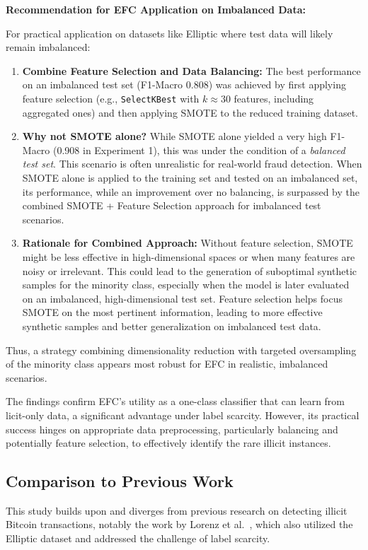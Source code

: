 \documentclass[12pt]{article}
\begin{document}
\begin{mdframed}[backgroundcolor=gray!10, roundcorner=5pt, linecolor=black, linewidth=1pt]
\textbf{Recommendation for EFC Application on Imbalanced Data:}

For practical application on datasets like Elliptic where test data will likely remain imbalanced:
\begin{enumerate}
    \item \textbf{Combine Feature Selection and Data Balancing:} The best performance on an imbalanced test set (F1-Macro 0.808)
    was achieved by first applying feature selection (e.g., \texttt{SelectKBest} with $k \approx 30$ features, including
    aggregated ones) and then applying SMOTE to the reduced training dataset.
    \item \textbf{Why not SMOTE alone?} While SMOTE alone yielded a very high F1-Macro (0.908 in Experiment 1), this was
    under the condition of a \textit{balanced test set}. This scenario is often unrealistic for real-world fraud detection.
    When SMOTE alone is applied to the training set and tested on an imbalanced set, its performance, while an improvement
    over no balancing, is surpassed by the combined SMOTE + Feature Selection approach for imbalanced test scenarios.
    \item \textbf{Rationale for Combined Approach:} Without feature selection, SMOTE might be less effective in high-dimensional
    spaces or when many features are noisy or irrelevant. This could lead to the generation of suboptimal synthetic samples
    for the minority class, especially when the model is later evaluated on an imbalanced, high-dimensional test set. Feature
    selection helps focus SMOTE on the most pertinent information, leading to more effective synthetic samples and better
    generalization on imbalanced test data.
\end{enumerate}
Thus, a strategy combining dimensionality reduction with targeted oversampling of the minority class appears most robust
for EFC in realistic, imbalanced scenarios.
\end{mdframed}

The findings confirm EFC's utility as a one-class classifier that can learn from licit-only data, a significant advantage
under label scarcity. However, its practical success hinges on appropriate data preprocessing, particularly balancing and
potentially feature selection, to effectively identify the rare illicit instances.

\subsection{Comparison to Previous Work}\label{sec:comparision}
This study builds upon and diverges from previous research on detecting illicit Bitcoin transactions, notably the work by
Lorenz et al.~\cite{lorenz2021machinelearningmethodsdetect}, which also utilized the Elliptic dataset and addressed the
challenge of label scarcity.
\end{document}

